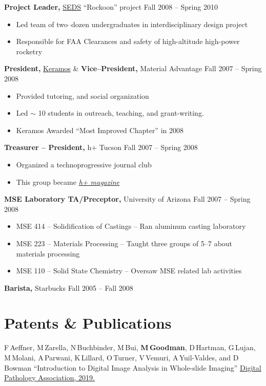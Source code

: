 \documentclass{res}
\begin{document}
\begin{resume}
{\bf Project Leader,}  \href{https://seds.arizona.edu/}{SEDS} ``Rockoon''  project \hfill   Fall 2008 -- Spring 2010
\begin{itemize} \itemsep -2pt
  \item Led team of two--dozen undergraduates in interdisciplinary design project
  \item Responsible for FAA Clearances and safety of high-altitude high-power rocketry
\end{itemize}

{\bf President,} \href{https://ceramics.org/members/member-communities/classes/keramos}{Keramos} \& {\bf Vice--President,} Material Advantage \hfill Fall 2007 -- Spring 2008
\begin{itemize} \itemsep -2pt
  \item Provided tutoring, and social organization
  \item Led $\sim$ 10 students in outreach, teaching, and grant-writing.
  \item Keramos Awarded ``Most Improved Chapter'' in 2008
\end{itemize}

{\bf Treasurer -- President,} h+ Tucson \hfill Fall 2007 -- Spring 2008
\begin{itemize} \itemsep -2pt
  \item Organized a technoprogressive journal club
  \item This group became \href{http://hplusmagazine.com/}{\textit{h+ magazine}}
\end{itemize}

{\bf MSE Laboratory TA/Preceptor,} University of Arizona \hfill Fall 2007 -- Spring 2008
\begin{itemize} \itemsep -2pt
  \item MSE 414 -- Solidification of Castings -- Ran aluminum casting laboratory
  \item MSE 223 -- Materials Processing -- Taught three groups of 5--7 about materials processing
  \item MSE 110 -- Solid State Chemistry -- Oversaw MSE related lab activities
\end{itemize}

{\bf Barista,} Starbucks \hfill Fall 2005 -- Fall 2008

\section{Patents \& Publications}

  F\,Aeffner, M\,Zarella, N\,Buchbinder, M\,Bui, \textbf{M\,Goodman}, 
  D\,Hartman, G\,Lujan, M\,Molani, A\,Parwani, K\,Lillard, O\,Turner,
  V\,Vemuri, A\,Yuil-Valdes, and D\,Bowman
  ``Introduction to Digital Image Analysis in Whole-slide Imaging''
  \href{http://www.jpathinformatics.org/temp/JPatholInform1019-318182_000518.pdf}{Digital Pathology Association, 2019.}


\end{resume}
\end{document}
